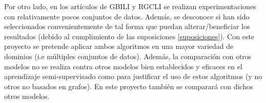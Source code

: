 Por otro lado, en los artículos de GBILI \cite{berton2014graph} y RGCLI \cite{berton2017rgcli} se realizan experimentaciones con relativamente pocos conjuntos de datos. Además, se desconoce si han sido seleccionados convenientemente de tal forma que puedan alterar/beneficiar los resultados (debido al cumplimiento de las suposiciones \ref{suposiciones}). Con este proyecto se pretende aplicar ambos algoritmos en una mayor variedad de dominios (i.e múltiples conjuntos de datos). Además, la comparación con otros modelos no se realiza contra otros modelos bien establecidos y eficaces en el aprendizaje semi-supervisado como para justificar el uso de estos algoritmos (y no otros no basados en grafos). En este proyecto también se comparará con dichos otros modelos.
